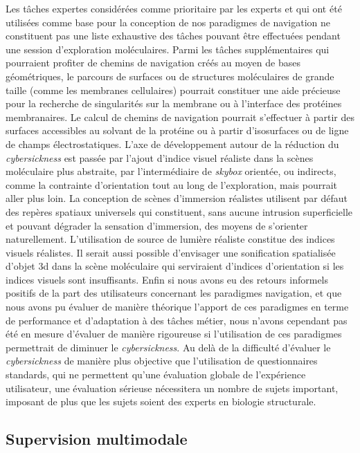 {Les tâches expertes considérées comme prioritaire par les experts et qui ont été utilisées comme base pour la conception de nos paradigmes de navigation ne constituent pas une liste exhaustive des tâches pouvant être effectuées pendant une session d'exploration moléculaires. Parmi les tâches supplémentaires qui pourraient profiter de chemins de navigation créés au moyen de bases géométriques, le parcours de surfaces ou de structures moléculaires de grande taille (comme les membranes cellulaires) pourrait constituer une aide précieuse pour la recherche de singularités sur la membrane ou à l'interface des protéines membranaires. Le calcul de chemins de navigation pourrait s'effectuer à partir des surfaces accessibles au solvant de la protéine ou à partir d'isosurfaces ou de ligne de champs électrostatiques. 
L'axe de développement autour de la réduction du \textit{cybersickness} est passée par l'ajout  d'indice visuel réaliste dans la scènes moléculaire plus abstraite, par l'intermédiaire de \textit{skybox} orientée, ou indirects, comme la contrainte d'orientation tout au long de l'exploration, mais pourrait aller plus loin. La conception de scènes d'immersion réalistes utilisent par défaut des repères spatiaux universels qui constituent, sans aucune intrusion superficielle et pouvant dégrader la sensation d'immersion, des moyens de s'orienter naturellement. L'utilisation de source de lumière réaliste constitue des indices visuels réalistes. Il serait aussi possible d'envisager une sonification spatialisée d'objet 3d dans la scène moléculaire qui serviraient d'indices d'orientation si les indices visuels sont insuffisants. Enfin si nous avons eu des retours informels positifs de la part des utilisateurs concernant les paradigmes navigation, et que nous avons pu évaluer de manière théorique l'apport de ces paradigmes en terme de performance et d'adaptation à des tâches métier, nous n'avons cependant pas été en mesure d'évaluer de manière rigoureuse si l'utilisation de ces paradigmes permettrait de diminuer le \textit{cybersickness}. Au delà de la difficulté d'évaluer le \emph{cybersickness} de manière plus objective que l'utilisation de questionnaires standards, qui ne permettent qu'une évaluation globale de l'expérience utilisateur, une évaluation sérieuse nécessitera un nombre de sujets important, imposant de plus que les sujets soient des experts en biologie structurale.

\subsection*{Supervision multimodale}

}
